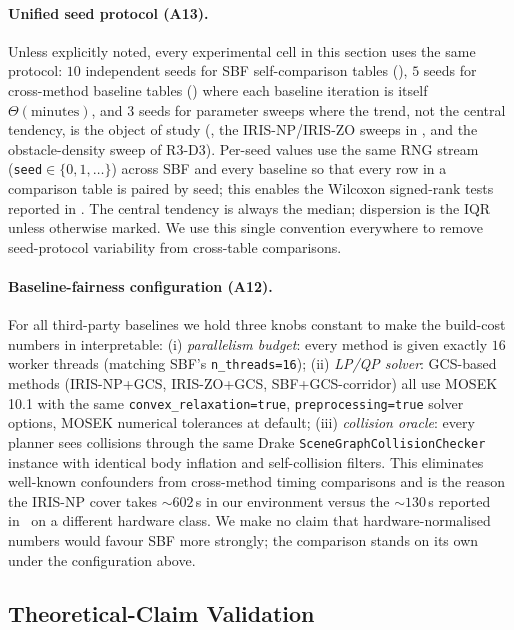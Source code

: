 \documentclass[journal]{IEEEtran}
\begin{document}
\paragraph{Unified seed protocol (A13).}
Unless explicitly noted, every experimental cell in this section uses
the same protocol: $10$ independent seeds for SBF self-comparison
tables (), $5$ seeds for
cross-method baseline tables () where each
baseline iteration is itself $\Theta(\text{minutes})$, and $3$ seeds
for parameter sweeps where the trend, not the central tendency,
is the object of study (, the IRIS-NP/IRIS-ZO
sweeps in , and the obstacle-density sweep
of R3-D3). Per-seed values use the same RNG stream
(\texttt{seed}$\in\{0,1,\ldots\}$) across SBF and every baseline so
that every row in a comparison table is paired by seed; this enables
the Wilcoxon signed-rank tests reported in .
The central tendency is always the median; dispersion is the IQR
unless otherwise marked. We use this single convention everywhere
to remove seed-protocol variability from cross-table comparisons.

\paragraph{Baseline-fairness configuration (A12).}
For all third-party baselines we hold three knobs constant to make
the build-cost numbers in  interpretable:
(i) \emph{parallelism budget}: every method is given exactly
$16$ worker threads (matching SBF's \texttt{n\_threads=16});
(ii) \emph{LP/QP solver}: GCS-based methods (IRIS-NP+GCS,
IRIS-ZO+GCS, SBF+GCS-corridor) all use MOSEK 10.1 with the same
\texttt{convex\_relaxation=true},
\texttt{preprocessing=true} solver options, MOSEK numerical
tolerances at default;
(iii) \emph{collision oracle}: every planner sees collisions through
the same Drake \texttt{SceneGraphCollisionChecker} instance with
identical body inflation and self-collision filters.
This eliminates well-known confounders from cross-method timing
comparisons and is the reason the IRIS-NP cover takes
${\sim}602$\,s in our environment versus the ${\sim}130$\,s
reported in~\cite{marcucci2024motion} on a different hardware
class. We make no claim that hardware-normalised numbers would
favour SBF more strongly; the comparison stands on its own under
the configuration above.

\subsection{Theoretical-Claim Validation}\label{sec:theory_validation}
\end{document}

